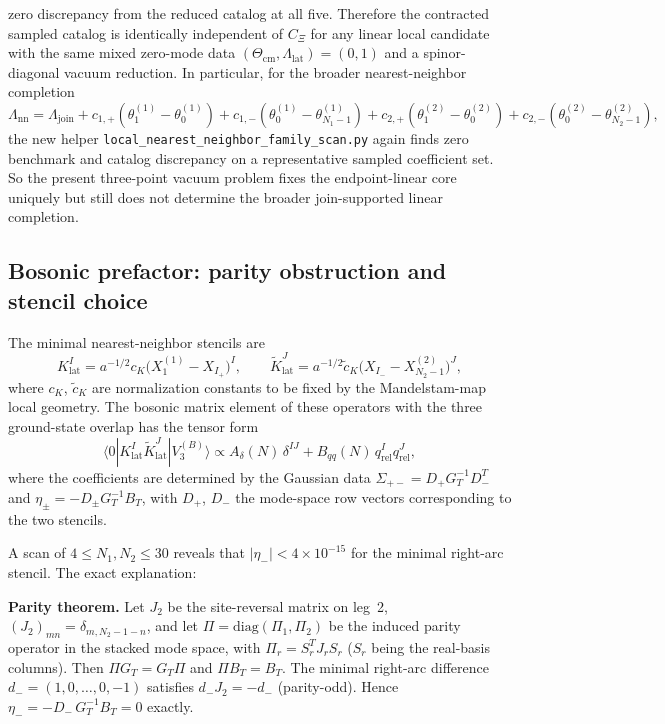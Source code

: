 \documentclass[11pt]{article}
\begin{document}
zero discrepancy from the reduced catalog at all five. Therefore the contracted
sampled catalog is identically independent of $C_\Xi$ for any linear local
candidate with the same mixed zero-mode data $(\Theta_{\mathrm{cm}},
\Lambda_{\mathrm{lat}})=(0,1)$ and a spinor-diagonal vacuum reduction. In
particular, for the broader nearest-neighbor completion
\[
\Lambda_{\mathrm{nn}}
=
\Lambda_{\mathrm{join}}
+c_{1,+}(\theta_1^{(1)}-\theta_0^{(1)})
+c_{1,-}(\theta_0^{(1)}-\theta_{N_1-1}^{(1)})
+c_{2,+}(\theta_1^{(2)}-\theta_0^{(2)})
+c_{2,-}(\theta_0^{(2)}-\theta_{N_2-1}^{(2)}),
\]
the new helper \texttt{local\_nearest\_neighbor\_family\_scan.py} again finds
zero benchmark and catalog discrepancy on a representative sampled coefficient
set. So the present three-point vacuum problem fixes the endpoint-linear core
uniquely but still does not determine the broader join-supported linear
completion.

\subsection{Bosonic prefactor: parity obstruction and stencil choice}

The minimal nearest-neighbor stencils are
\begin{equation}
K_{\mathrm{lat}}^I = a^{-1/2}c_K\bigl(X_1^{(1)} - X_{I_+}\bigr)^I,
\qquad
\widetilde K_{\mathrm{lat}}^J = a^{-1/2}\widetilde c_K\bigl(X_{I_-} - X_{N_2-1}^{(2)}\bigr)^J,
\label{eq:stencil-minimal}
\end{equation}
where $c_K$, $\widetilde c_K$ are normalization constants to be fixed by the Mandelstam-map local geometry. The bosonic matrix element of these operators with the three ground-state overlap has the tensor form
\begin{equation}
\langle 0|K_{\mathrm{lat}}^I\widetilde K_{\mathrm{lat}}^J|V_3^{(B)}\rangle
\propto A_\delta(N)\,\delta^{IJ} + B_{qq}(N)\,q_{\mathrm{rel}}^I q_{\mathrm{rel}}^J,
\label{eq:prefactor-tensor}
\end{equation}
where the coefficients are determined by the Gaussian data $\Sigma_{+-} = D_+ G_T^{-1}D_-^T$ and $\eta_\pm = -D_\pm G_T^{-1}B_T$, with $D_+$, $D_-$ the mode-space row vectors corresponding to the two stencils.

A scan of $4 \le N_1, N_2 \le 30$ reveals that $|\eta_-| < 4 \times 10^{-15}$ for the minimal right-arc stencil. The exact explanation:

\smallskip\noindent
\textbf{Parity theorem.} Let $J_2$ be the site-reversal matrix on leg~2, $(J_2)_{mn} = \delta_{m, N_2-1-n}$, and let $\Pi = \mathrm{diag}(\Pi_1, \Pi_2)$ be the induced parity operator in the stacked mode space, with $\Pi_r = S_r^T J_r S_r$ ($S_r$ being the real-basis columns). Then $\Pi G_T = G_T\Pi$ and $\Pi B_T = B_T$. The minimal right-arc difference $d_- = (1, 0, \dots, 0, -1)$ satisfies $d_- J_2 = -d_-$ (parity-odd). Hence $\eta_- = -D_-\,G_T^{-1}B_T = 0$ exactly.
\end{document}
